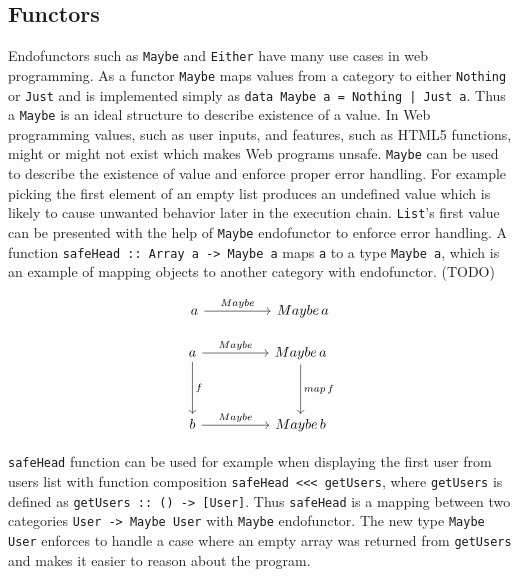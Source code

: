 \documentclass[article]{aaltoseries}
\begin{document}
    

  \subsection{Functors}
    Endofunctors such as \lstinline|Maybe| and \lstinline|Either| have many use
    cases in web programming. As a functor \lstinline|Maybe| maps values from a
    category to either \lstinline|Nothing| or \lstinline|Just| and is
    implemented simply as \lstinline{data Maybe a = Nothing | Just a}. Thus a
    \lstinline|Maybe| is an ideal structure to describe existence of a value. In
    Web programming values, such as user inputs, and features, such as HTML5
    functions, might or might not exist which makes Web programs unsafe.
    \lstinline|Maybe| can be used to describe the existence of value and enforce
    proper error handling. For example picking the first element of an empty
    list produces an undefined value which is likely to cause unwanted behavior
    later in the execution chain. \lstinline|List|'s first value can be
    presented with the help of \lstinline|Maybe| endofunctor to enforce error
    handling. A function \lstinline|safeHead :: Array a -> Maybe a| maps
    \lstinline|a| to a type \lstinline|Maybe a|, which is an example of mapping
    objects to another category with endofunctor. (TODO)

    \[
      \begin{tikzcd}[row sep=huge, column sep=huge]
        a \arrow[r, "Maybe"]
        & Maybe\, a
      \end{tikzcd}
    \]

    \[
      \begin{tikzcd}[row sep=huge, column sep=huge]
        a \arrow[r, "Maybe"]
        \arrow[d, "f"]
        & Maybe\, a
        \arrow[d, "map\, f"]
        \\
        b \arrow[r, "Maybe"]
        & Maybe\, b
      \end{tikzcd}
    \]

    \lstinline|safeHead| function can be used for example when displaying the
    first user from users list with function composition
    \lstinline|safeHead <<< getUsers|, where \lstinline|getUsers| is defined as
    \lstinline|getUsers :: () -> [User]|. Thus \lstinline|safeHead| is a mapping
    between two categories \lstinline|User -> Maybe User| with \lstinline|Maybe|
    endofunctor. The new type \lstinline|Maybe User| enforces to handle a case
    where an empty array was returned from \lstinline|getUsers| and makes it
    easier to reason about the program.
 
\end{document}
